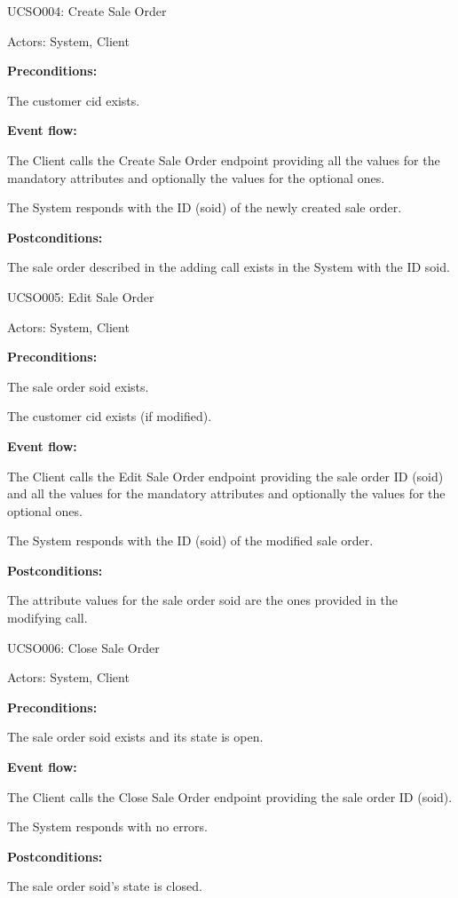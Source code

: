 \begin{ucbox}{UCSO004: Create Sale Order}
\label{UCSO004}

Actors: System, Client

\textbf{Preconditions:}

\ucitem The customer cid exists.

\textbf{Event flow:}

\ucitem The Client calls the Create Sale Order endpoint providing all the values for the mandatory attributes and optionally the values for the optional ones.

\ucitem The System responds with the ID (soid) of the newly created sale order.

\textbf{Postconditions:}

\ucitem The sale order described in the adding call exists in the System with the ID soid.

\end{ucbox}

\begin{ucbox}{UCSO005: Edit Sale Order}
\label{UCSO005}

Actors: System, Client

\textbf{Preconditions:}

\ucitem The sale order soid exists.

\ucitem The customer cid exists (if modified).

\textbf{Event flow:}

\ucitem The Client calls the Edit Sale Order endpoint providing the sale order ID (soid) and all the values for the mandatory attributes and optionally the values for the 
optional ones.

\ucitem The System responds with the ID (soid) of the modified sale order.

\textbf{Postconditions:}

\ucitem The attribute values for the sale order soid are the ones provided in the modifying call.

\end{ucbox}

\begin{ucbox}{UCSO006: Close Sale Order}
\label{UCSO006}

Actors: System, Client

\textbf{Preconditions:}

\ucitem The sale order soid exists and its state is open.

\textbf{Event flow:}

\ucitem The Client calls the Close Sale Order endpoint providing the sale order ID (soid).

\ucitem The System responds with no errors.

\textbf{Postconditions:}

\ucitem The sale order soid’s state is closed.

\end{ucbox}

